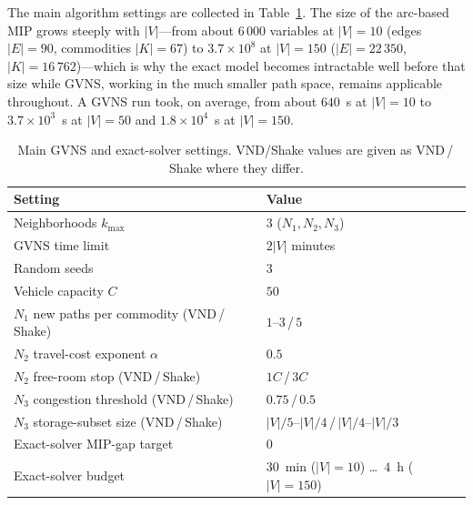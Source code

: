 \documentclass[runningheads]{llncs}
\begin{document}
The main algorithm settings are collected in Table~\ref{tab:params}. The size of
the arc-based MIP grows steeply with $|V|$---from about $6\,000$ variables at
$|V|=10$ (edges $|E|=90$, commodities $|K|=67$) to $3.7\times10^{8}$ at $|V|=150$
($|E|=22\,350$, $|K|=16\,762$)---which is why the exact model becomes intractable
well before that size while GVNS, working in the much smaller path space, remains
applicable throughout. A GVNS run took, on average, from about $640$~s at
$|V|=10$ to $3.7\times10^{3}$~s at $|V|=50$ and $1.8\times10^{4}$~s at $|V|=150$.

\begin{table}[t]
\centering
\caption{Main GVNS and exact-solver settings. VND/Shake values are given as
VND\,/\,Shake where they differ.}
\label{tab:params}
\small
\begin{tabular}{ll}
\toprule
Setting & Value\\
\midrule
Neighborhoods $k_{\max}$ & $3$ ($N_1,N_2,N_3$)\\
GVNS time limit & $2|V|$ minutes\\
Random seeds & $3$\\
Vehicle capacity $C$ & $50$\\
$N_1$ new paths per commodity (VND\,/\,Shake) & $1$--$3$\,/\,$5$\\
$N_2$ travel-cost exponent $\alpha$ & $0.5$\\
$N_2$ free-room stop (VND\,/\,Shake) & $1C$\,/\,$3C$\\
$N_3$ congestion threshold (VND\,/\,Shake) & $0.75$\,/\,$0.5$\\
$N_3$ storage-subset size (VND\,/\,Shake) & $|V|/5$--$|V|/4$\,/\,$|V|/4$--$|V|/3$\\
Exact-solver MIP-gap target & $0$\\
Exact-solver budget & $30$~min ($|V|{=}10$) \dots\ $4$~h ($|V|{=}150$)\\
\bottomrule
\end{tabular}
\end{table}
\end{document}
